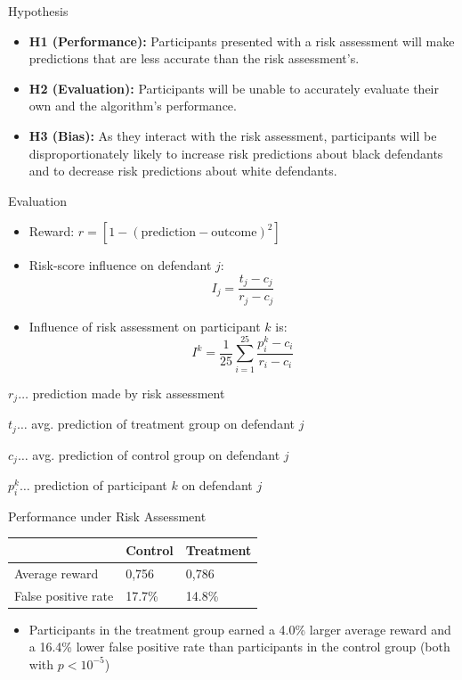 \documentclass[11pt]{beamer}
\begin{document}
\begin{frame}{Hypothesis}
\begin{itemize}
	\item \textbf{H1 (Performance): }Participants presented with a
	risk assessment will make predictions that are less accurate
	than the risk assessment’s.
	\item \textbf{H2 (Evaluation): }Participants will be unable to accurately evaluate their own and the algorithm’s performance.
	\item \textbf{H3 (Bias): }As they interact with the risk assessment, participants will be disproportionately likely to increase risk predictions about black defendants and to decrease risk predictions about white defendants.
\end{itemize}
\end{frame}


\begin{frame}{Evaluation}
\begin{itemize}
	\item Reward: $r = [1-(\text{prediction}-\text{outcome})^2]$\\
	\item Risk-score influence on defendant $j$: $$I_j = \frac{t_j - c_j}{r_j - c_j}$$
	\item Influence of risk assessment on participant $k$ is: $$I^k = \frac{1}{25}\sum^{25}_{i=1}\frac{p_i^k -c_i}{r_i-c_i}$$
\end{itemize}
{\footnotesize
$r_j \ldots$ prediction made by risk assessment 

$t_j \ldots$ avg. prediction of treatment group on defendant $j$ 

$c_j \ldots$ avg. prediction of control group on defendant $j$ 

$p_i^k \ldots$ prediction of participant $k$ on defendant $j$ 


}

\end{frame}


\begin{frame}{Performance under Risk Assessment}
\begin{table}[]
	\begin{tabular}{@{}lll}
		\toprule
		& \textbf{Control} & \textbf{Treatment} \\ \midrule
		Average reward      & 0,756            & 0,786               \\ \midrule
		False positive rate & 17.7\%           & 14.8\%              \\ \bottomrule
	\end{tabular}
\end{table}
\begin{itemize}
	\item Participants in the treatment group earned a 4.0\% larger average
	reward and a 16.4\% lower false positive rate than participants in the
	control group (both with $p < 10^{-5}$)
\end{itemize}
\end{frame}
\end{document}
